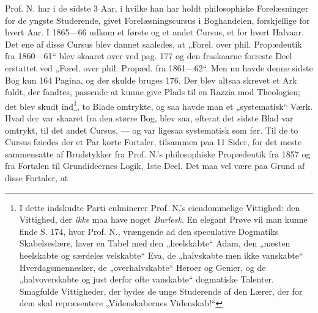 \documentclass[12pt,a4paper]{book}
\begin{document}
Prof. N. har i de sidste 3 Aar, i hvilke han har holdt philosophiske
Forelæsninger for de yngste Studerende, givet Forelæsningscursus i Boghandelen,
forskjellige for hvert Aar. I 1865---66 udkom et første og et andet Cursus, et
for hvert Halvaar. Det ene af disse Cursus blev dannet saaledes, at „Forel. over
phil. Propædeutik fra 1860---61“ blev skaaret over ved pag. 177 og den
fraskaarne forreste Deel erstattet ved „Forel. over phil. Propæd. fra
1861---62“. Men nu havde denne sidste Bog kun 164 Pagina, og der skulde bruges
176. Der blev altsaa skrevet et Ark fuldt, der fandtes, passende at kunne give
Plads til en Razzia mod Theologien; det blev skudt ind\footnote{%
  I dette indskudte Parti culminerer Prof. N.'s eiendommelige Vittighed: den
  Vittighed, der \emph{ikke} maa have noget \emph{Burlesk}. En elegant Prøve vil
  man kunne finde S. 174, hvor Prof. N., vrængende ad den speculative Dogmatiks
  Skabelseslære, laver en Tabel med den „heelskabte“ Adam, den „næsten
  heelskabte og særdeles velskabte“ Eva, de „halvskabte men ikke vanskabte“
  Hverdagsmennesker, de „overhalvskabte“ Heroer og Genier, og de „halvoverskabte
  og just derfor ofte vanskabte“ dogmatiske Talenter. Smagfulde Vittigheder, der
  bydes de unge Studerende af den Lærer, der for dem skal repræsentere
  „Videnskabernes Videnskab!“}, to Blade omtrykte, og saa havde man et
„systematisk“ Værk. Hvad der var skaaret fra den større Bog, blev saa, efterat
det sidste Blad var omtrykt, til det andet Cursus, --- og var ligesaa
systematisk som før. Til de to Cursus føiedes der et Par korte Fortaler,
tilsammen paa 11 Sider, for det meste sammensatte af Brudstykker fra Prof. N.'s
philosophiske Propædeutik fra 1857 og fra Fortalen til Grundideernes Logik,
1ste Deel. Det maa vel være paa Grund af disse Fortaler, at
\end{document}
